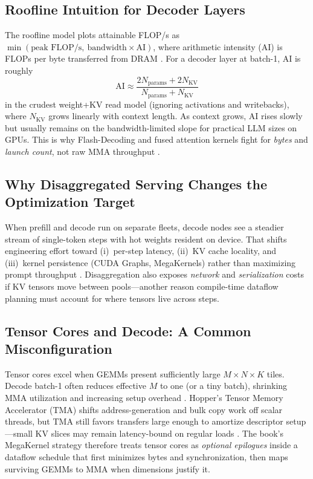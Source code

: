 \subsection{Roofline Intuition for Decoder Layers}
\label{sec:roofline_decode}

The roofline model plots attainable FLOP/s as $\min(\text{peak FLOP/s},\ \text{bandwidth} \times \text{AI})$, where arithmetic intensity (AI) is FLOPs per byte transferred from DRAM \citep{patel2025llminference}.
For a decoder layer at batch-1, AI is roughly
\[
  \mathrm{AI} \approx \frac{2N_{\mathrm{params}} + 2N_{\mathrm{KV}}}{N_{\mathrm{params}} + N_{\mathrm{KV}}}
\]
in the crudest weight+KV read model (ignoring activations and writebacks), where $N_{\mathrm{KV}}$ grows linearly with context length.
As context grows, AI rises slowly but usually remains on the bandwidth-limited slope for practical LLM sizes on GPUs.
This is why Flash-Decoding and fused attention kernels fight for \emph{bytes} and \emph{launch count}, not raw MMA throughput \citep{dao2022flashattention}.

\subsection{Why Disaggregated Serving Changes the Optimization Target}
\label{sec:disagg}

When prefill and decode run on separate fleets, decode nodes see a steadier stream of single-token steps with hot weights resident on device.
That shifts engineering effort toward (i)~per-step latency, (ii)~KV cache locality, and (iii)~kernel persistence (CUDA Graphs, MegaKernels) rather than maximizing prompt throughput \citep{patel2025llminference,kwon2023vllm}.
Disaggregation also exposes \emph{network} and \emph{serialization} costs if KV tensors move between pools---another reason compile-time dataflow planning must account for where tensors live across steps.


\subsection{Tensor Cores and Decode: A Common Misconfiguration}
\label{sec:tc_decode}

Tensor cores excel when GEMMs present sufficiently large $M\times N\times K$ tiles.
Decode batch-1 often reduces effective $M$ to one (or a tiny batch), shrinking MMA utilization and increasing setup overhead \citep{semianalysis2024tma}.
Hopper's Tensor Memory Accelerator (TMA) shifts address-generation and bulk copy work off scalar threads, but TMA still favors transfers large enough to amortize descriptor setup---small KV slices may remain latency-bound on regular loads \citep{nvidia2022hopper,semianalysis2024tma}.
The book's MegaKernel strategy therefore treats tensor cores as \emph{optional epilogues} inside a dataflow schedule that first minimizes bytes and synchronization, then maps surviving GEMMs to MMA when dimensions justify it.

